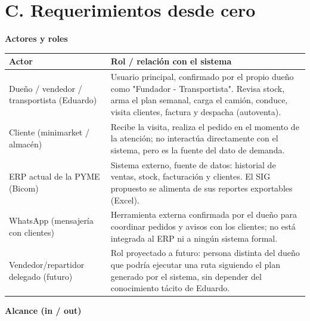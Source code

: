 \documentclass[10pt,a4paper]{article}
\begin{document}
\newpage
\section*{C. Requerimientos desde cero}

\textbf{Actores y roles}

\begin{center}

\renewcommand{\arraystretch}{1.3}
\setlength{\tabcolsep}{6pt}

\begin{tabular}{|p{4cm}|p{10cm}|}
\hline

\textbf{Actor} & \textbf{Rol / relación con el sistema} \\ \hline

Dueño / vendedor / transportista (Eduardo) &
Usuario principal, confirmado por el propio dueño como "Fundador - Transportista". Revisa stock, arma el plan semanal, carga el camión, conduce, visita clientes, factura y despacha (autoventa). \\ \hline

Cliente (minimarket / almacén) &
Recibe la visita, realiza el pedido en el momento de la atención; no interactúa directamente con el sistema, pero es la fuente del dato de demanda. \\ \hline

ERP actual de la PYME (Bicom) &
Sistema externo, fuente de datos: historial de ventas, stock, facturación y clientes. El SIG propuesto se alimenta de sus reportes exportables (Excel). \\ \hline

WhatsApp (mensajería con clientes) &
Herramienta externa confirmada por el dueño para coordinar pedidos y avisos con los clientes; no está integrada al ERP ni a ningún sistema formal. \\ \hline

Vendedor/repartidor delegado (futuro) &
Rol proyectado a futuro: persona distinta del dueño que podría ejecutar una ruta siguiendo el plan generado por el sistema, sin depender del conocimiento tácito de Eduardo. \\ \hline

\end{tabular}

\end{center}

\textbf{Alcance (in / out)}

\vspace{0.3cm}
\end{document}
